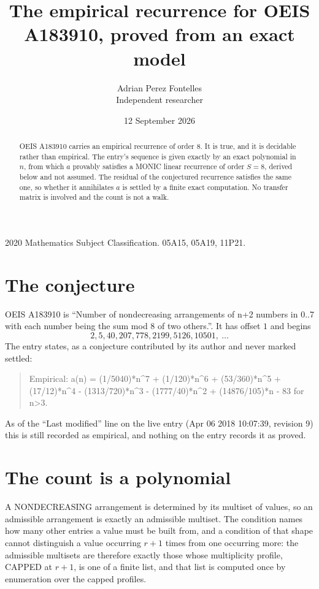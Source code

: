 \documentclass[11pt,a4paper]{article}
\title{The empirical recurrence for OEIS A183910, proved from an exact model}
\author{Adrian Perez Fontelles\\ \small Independent researcher}
\date{12 September 2026}
\theoremstyle{plain}
\theoremstyle{definition}
\begin{document}
\maketitle

\begin{abstract}
OEIS A183910 carries an empirical recurrence of order $8$. It is true, and it is
decidable rather than empirical. The entry's sequence is given exactly by an exact polynomial in $n$, from
which $a$ provably satisfies a MONIC linear recurrence of order $S=8$, derived below and not
assumed. The residual of the conjectured recurrence satisfies the same one, so whether it
annihilates $a$ is settled by a finite exact computation. No transfer matrix is involved and
the count is not a walk.
\end{abstract}

\noindent\small 2020 Mathematics Subject Classification. 05A15, 05A19, 11P21.\normalsize

\section{The conjecture}

OEIS A183910 is ``Number of nondecreasing arrangements of n+2 numbers in 0..7 with each number being the sum mod 8 of two others.''. It has offset $1$ and begins
\[
2, 5, 40, 207, 778, 2199, 5126, 10501,\ \dots
\]
The entry states, as a conjecture contributed by its author and never marked settled:
\begin{quote}
Empirical: a(n) = (1/5040)*n\^{}7 + (1/120)*n\^{}6 + (53/360)*n\^{}5 + (17/12)*n\^{}4 - (1313/720)*n\^{}3 - (1777/40)*n\^{}2 + (14876/105)*n - 83 for n>3.
\end{quote}
As of the ``Last modified'' line on the live entry (Apr 06 2018 10:07:39, revision 9)
this is still recorded as empirical, and nothing on the entry records it as proved.

\section{The count is a polynomial}

A NONDECREASING arrangement is determined by its multiset of values, so an admissible
arrangement is exactly an admissible multiset. The condition names how many other entries a
value must be built from, and a condition of that shape cannot distinguish a value occurring
$r+1$ times from one occurring more: the admissible multisets are therefore exactly those
whose multiplicity profile, CAPPED at $r+1$, is one of a finite list, and that list is computed
once by enumeration over the capped profiles.
\end{document}
